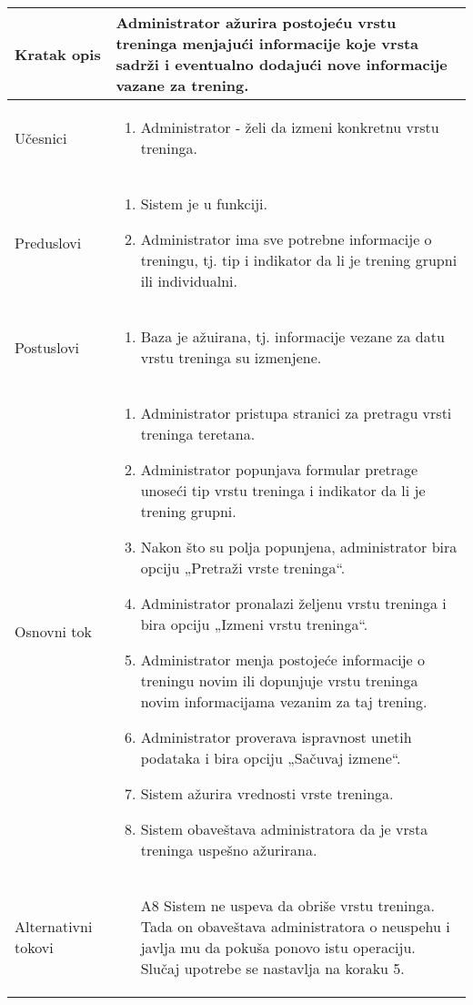 \documentclass[../main.tex]{subfiles}
\begin{document}
\begin{longtable}{| p{} | p{} |} 

\hline
    Kratak opis &  Administrator ažurira postojeću vrstu treninga menjajući informacije koje vrsta sadrži i eventualno dodajući nove informacije vazane za trening.\\ 
\hline    
    Učesnici & 
    	\begin{enumerate}
        \item Administrator - želi da izmeni konkretnu vrstu treninga.
     \end{enumerate}\\
\hline
   Preduslovi & \begin{enumerate}
       \item Sistem je u funkciji.
       \item Administrator ima sve potrebne informacije o treningu, tj. tip i indikator da li je trening grupni ili individualni.
   \end{enumerate}\\
\hline  
    Postuslovi & \begin{enumerate}
        \item Baza je ažuirana, tj. informacije vezane za datu vrstu treninga su izmenjene.
    \end{enumerate}\\
\hline
    Osnovni tok & \begin{enumerate}
        \item Administrator pristupa stranici za pretragu vrsti treninga teretana.
        \item Administrator popunjava formular pretrage unoseći tip vrstu treninga i indikator da li je trening grupni.
        \item Nakon što su polja popunjena, administrator bira opciju „Pretraži vrste treninga“.
        \item Administrator pronalazi željenu vrstu treninga i bira opciju „Izmeni vrstu treninga“.
        \item Administrator menja postojeće informacije o treningu novim ili dopunjuje vrstu treninga novim informacijama vezanim za taj trening.
        \item Administrator proverava ispravnost unetih podataka i bira opciju „Sačuvaj izmene“.
        \item Sistem ažurira vrednosti vrste treninga.
        \item Sistem obaveštava administratora da je vrsta treninga uspešno ažurirana.
    \end{enumerate}\\
\hline
    Alternativni tokovi & \begin{itemize}
        \item[A8]  Sistem ne uspeva da obriše vrstu treninga. Tada on obaveštava administratora o neuspehu i javlja mu da pokuša ponovo istu operaciju. Slučaj upotrebe se nastavlja na koraku 5.


\end{itemize}
\end{longtable}
\end{document}
